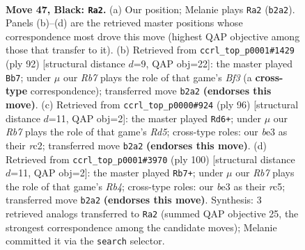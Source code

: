 \documentclass[11pt]{article}
\begin{document}
\clearpage

\begin{figure}[p]\centering
\begin{subfigure}{0.46\textwidth}\centering
\resizebox{\linewidth}{!}{%
\newchessgame
\chessboard[
  setfen={8/p7/Pp4k1/8/8/4B1K1/1r6/8 b - - 3 47},
  showmover=false,
  pgfstyle=straightmove, color=movearrow, markmove={b2-a2}
]}
\caption{}
\end{subfigure}\hfill
\begin{subfigure}{0.46\textwidth}\centering
\resizebox{\linewidth}{!}{%
\newchessgame
\chessboard[
  setfen={3b4/8/p3k3/P7/1PK5/5B2/8/8 w - - 2 47},
  showmover=false,
  pgfstyle=straightmove, color=movearrow, markmove={f3-b7}
]}
\caption{}
\end{subfigure}
\\[4pt]
\begin{subfigure}{0.46\textwidth}\centering
\resizebox{\linewidth}{!}{%
\newchessgame
\chessboard[
  setfen={8/8/5k1p/3R1P1P/1K6/8/2r5/8 w - - 3 49},
  showmover=false,
  pgfstyle=straightmove, color=movearrow, markmove={d5-d6}
]}
\caption{}
\end{subfigure}\hfill
\begin{subfigure}{0.46\textwidth}\centering
\resizebox{\linewidth}{!}{%
\newchessgame
\chessboard[
  setfen={8/6k1/4p1P1/2r5/1R3P2/8/5K2/8 w - - 1 51},
  showmover=false,
  pgfstyle=straightmove, color=movearrow, markmove={b4-b7}
]}
\caption{}
\end{subfigure}
\caption{\textbf{Move 47, Black: \texttt{Ra2}.} (a) Our position; Melanie plays \texttt{Ra2} (\texttt{b2a2}). Panels (b)--(d) are the retrieved master positions whose correspondence most drove this move (highest QAP objective among those that transfer to it). (b) Retrieved from \texttt{ccrl\_top\_p0001\#1429} (ply 92) [structural distance $d$=9, QAP obj=22]: the master played \texttt{Bb7}; under $\mu$ our \emph{Rb7} plays the role of that game's \emph{Bf3} (a \textbf{cross-type} correspondence); transferred move \texttt{b2a2} \textbf{(endorses this move)}. (c) Retrieved from \texttt{ccrl\_top\_p0000\#924} (ply 96) [structural distance $d$=11, QAP obj=2]: the master played \texttt{Rd6+}; under $\mu$ our \emph{Rb7} plays the role of that game's \emph{Rd5}; cross-type roles: our \emph{b}e3 as their \emph{r}c2; transferred move \texttt{b2a2} \textbf{(endorses this move)}. (d) Retrieved from \texttt{ccrl\_top\_p0001\#3970} (ply 100) [structural distance $d$=11, QAP obj=2]: the master played \texttt{Rb7+}; under $\mu$ our \emph{Rb7} plays the role of that game's \emph{Rb4}; cross-type roles: our \emph{b}e3 as their \emph{r}c5; transferred move \texttt{b2a2} \textbf{(endorses this move)}. Synthesis: 3 retrieved analogs transferred to \texttt{Ra2} (summed QAP objective 25, the strongest correspondence among the candidate moves); Melanie committed it via the \texttt{search} selector.}
\label{fig:thought-m93}
\end{figure}
\end{document}
